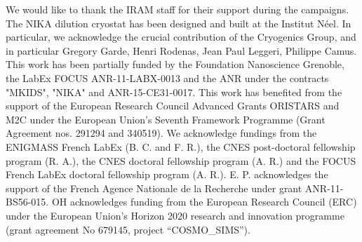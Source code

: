 \documentclass[twocolumn,traditabstract]{aa}
\begin{document}
\begin{acknowledgements}
We would like to thank the IRAM staff for their support during the campaigns. 
The NIKA dilution cryostat has been designed and built at the Institut N\'eel. In particular, we acknowledge the crucial contribution of the Cryogenics Group, and  in particular Gregory Garde, Henri Rodenas, Jean Paul Leggeri, Philippe Camus. 
This work has been partially funded by the Foundation Nanoscience Grenoble, the LabEx FOCUS ANR-11-LABX-0013 and the ANR under the contracts "MKIDS", "NIKA" and ANR-15-CE31-0017. 
This work has benefited from the support of the European Research Council Advanced Grants ORISTARS and M2C under the European Union's Seventh Framework Programme (Grant Agreement nos. 291294 and 340519).
We acknowledge fundings from the ENIGMASS French LabEx (B. C. and F. R.), the CNES post-doctoral fellowship program (R. A.),  the CNES doctoral fellowship program (A. R.) and the FOCUS French LabEx doctoral fellowship program (A. R.).
E. P. acknowledges the support of the French Agence Nationale de la Recherche under grant ANR-11-BS56-015.
OH acknowledges funding from the European Research Council (ERC) under the European Union's Horizon 2020 research and innovation programme (grant agreement No 679145, project “COSMO\_SIMS”).
\end{acknowledgements}


\end{document}
